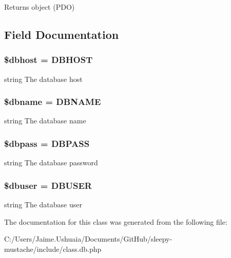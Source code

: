 \begin{DoxyReturn}{Returns}
object (P\-D\-O) 
\end{DoxyReturn}


\subsection{Field Documentation}
\hypertarget{class_d_b_a580dd98ba7f04c133d1a1e1b01af4a30}{
\subsubsection[{\$dbhost}]{\setlength{\rightskip}{0pt plus 5cm}\$dbhost = D\-B\-H\-O\-S\-T\hspace{0.3cm}{\ttfamily [static]}}}\label{class_d_b_a580dd98ba7f04c133d1a1e1b01af4a30}
string The database host \hypertarget{class_d_b_ac5111a571fffa2499732833bb7f0d8c1}{
\subsubsection[{\$dbname}]{\setlength{\rightskip}{0pt plus 5cm}\$dbname = D\-B\-N\-A\-M\-E\hspace{0.3cm}{\ttfamily [static]}}}\label{class_d_b_ac5111a571fffa2499732833bb7f0d8c1}
string The database name \hypertarget{class_d_b_a95e283b6dd5867f7b99c160bebf9826c}{
\subsubsection[{\$dbpass}]{\setlength{\rightskip}{0pt plus 5cm}\$dbpass = D\-B\-P\-A\-S\-S\hspace{0.3cm}{\ttfamily [static]}}}\label{class_d_b_a95e283b6dd5867f7b99c160bebf9826c}
string The database password \hypertarget{class_d_b_a8d5ac1c3396a540f025f9bbe56a5b568}{
\subsubsection[{\$dbuser}]{\setlength{\rightskip}{0pt plus 5cm}\$dbuser = D\-B\-U\-S\-E\-R\hspace{0.3cm}{\ttfamily [static]}}}\label{class_d_b_a8d5ac1c3396a540f025f9bbe56a5b568}
string The database user 

The documentation for this class was generated from the following file\-:\begin{DoxyCompactItemize}
\item 
C\-:/\-Users/\-Jaime.\-Ushuaia/\-Documents/\-Git\-Hub/sleepy-\/mustache/include/class.\-db.\-php\end{DoxyCompactItemize}

